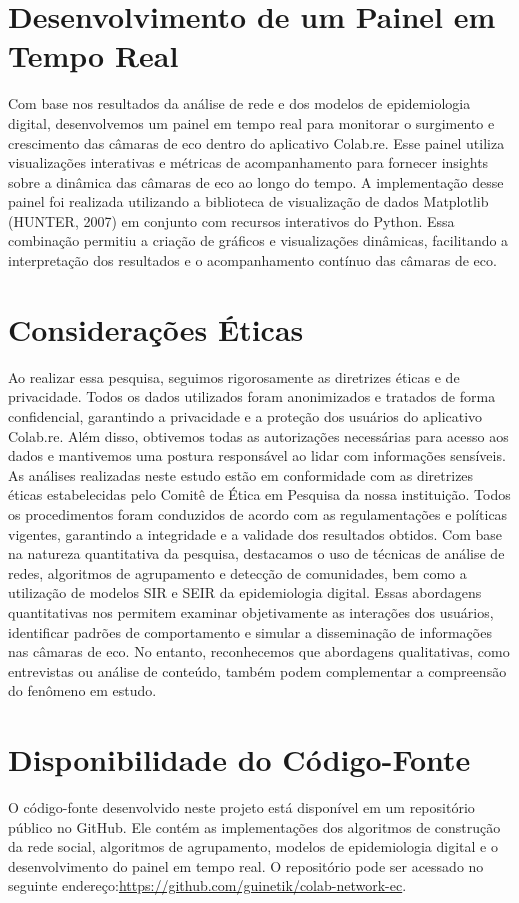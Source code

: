 \section{Desenvolvimento de um Painel em Tempo Real}
Com base nos resultados da análise de rede e dos modelos de epidemiologia digital, desenvolvemos um painel em tempo real para monitorar o surgimento e crescimento das câmaras de eco dentro do aplicativo Colab.re. Esse painel utiliza visualizações interativas e métricas de acompanhamento para fornecer insights sobre a dinâmica das câmaras de eco ao longo do tempo.
A implementação desse painel foi realizada utilizando a biblioteca de visualização de dados Matplotlib (HUNTER, 2007) em conjunto com recursos interativos do Python. Essa combinação permitiu a criação de gráficos e visualizações dinâmicas, facilitando a interpretação dos resultados e o acompanhamento contínuo das câmaras de eco.

\section{Considerações Éticas}
Ao realizar essa pesquisa, seguimos rigorosamente as diretrizes éticas e de privacidade. Todos os dados utilizados foram anonimizados e tratados de forma confidencial, garantindo a privacidade e a proteção dos usuários do aplicativo Colab.re. Além disso, obtivemos todas as autorizações necessárias para acesso aos dados e mantivemos uma postura responsável ao lidar com informações sensíveis.
As análises realizadas neste estudo estão em conformidade com as diretrizes éticas estabelecidas pelo Comitê de Ética em Pesquisa da nossa instituição. Todos os procedimentos foram conduzidos de acordo com as regulamentações e políticas vigentes, garantindo a integridade e a validade dos resultados obtidos.
Com base na natureza quantitativa da pesquisa, destacamos o uso de técnicas de análise de redes, algoritmos de agrupamento e detecção de comunidades, bem como a utilização de modelos SIR e SEIR da epidemiologia digital. Essas abordagens quantitativas nos permitem examinar objetivamente as interações dos usuários, identificar padrões de comportamento e simular a disseminação de informações nas câmaras de eco. No entanto, reconhecemos que abordagens qualitativas, como entrevistas ou análise de conteúdo, também podem complementar a compreensão do fenômeno em estudo.

\section{Disponibilidade do Código-Fonte}
O código-fonte desenvolvido neste projeto está disponível em um repositório público no GitHub. Ele contém as implementações dos algoritmos de construção da rede social, algoritmos de agrupamento, modelos de epidemiologia digital e o desenvolvimento do painel em tempo real. O repositório pode ser acessado no seguinte endereço:\url{https://github.com/guinetik/colab-network-ec}.
